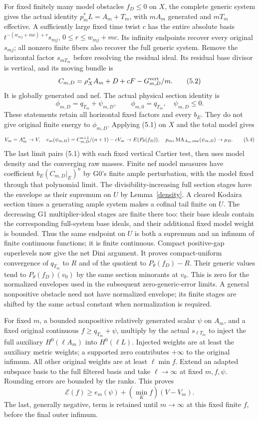 \documentclass[10pt]{article}
\newcommand{\MA}{\operatorname{MA}}
\begin{document}
For fixed finitely many model obstacles $f_D\leq0$ on $X$, the complete
generic system gives the actual identity $p_m^*L=A_m+T_m$, with
$mA_m$ generated and $mT_m$ effective. A sufficiently large fixed time
twist $c$ has the entire absolute basis
$t^{-(w_{mj}+mc)+r}s_{mj}$, $0\leq r\leq w_{mj}+mc$.
Its infinity endpoints recover every original $s_{mj}$; all nonzero
finite fibers also recover the full generic system. Remove the horizontal
factor $s_{mT_m}$ before resolving the residual ideal. Its residual base
divisor is vertical, and its moving bundle is
\[
 C_{m,D}=\rho_X^*A_m+D+cF-G_{m,D}^{\rm vert}/m.
 \tag{5.2}
\]
It is globally generated and nef. The actual physical section identity is
\[
 \phi_{m,D}=q_{T_m}+\psi_{m,D},\qquad\phi_{m,0}=q_{T_m},
 \quad\psi_{m,D}\leq0.
 \tag{5.3}
\]
These statements retain all horizontal fixed factors and every $b_E$.
They do not give original finite energy to $\phi_{m,D}$.
Applying (5.1) on $X$ and the total model gives
\[
 V_m=A_m^n\to V,\quad
 e_m(\psi_{m,D})=C_{m,D}^{n+1}/(n+1)-cV_m\to E(P_\theta(f_D)),
 \quad p_{m*}\MA_{A_m,\rm raw}(\psi_{m,D})\to\mu_D.
 \tag{5.4}
\]
The last limit pairs (5.1) with each fixed vertical Cartier test, then
uses model density and the converging raw masses. Finite nef model
measures have coefficient $b_E(C_{m,D}|_E)^n$ by G0's finite ample
perturbation, with the model fixed through that polynomial limit.
The divisibility-increasing full section stages have the envelope as
their supremum on $U$ by Lemma~\ref{density}. A cleared Kodaira section
times a generating ample system makes a cofinal tail finite on $U$.
The decreasing G1 multiplier-ideal stages are finite there too: their
base ideals contain the corresponding full-system base ideals, and their
additional fixed model weight is bounded. Thus the same endpoint on $U$
is both a supremum and an infimum of finite continuous functions; it is
finite continuous. Compact positive-gap superlevels now give the net
Dini argument. It proves compact-uniform convergence of $q_{T_m}$ to $R$
and of the quotient to $P_\theta(f_D)-R$.
Their generic values tend to $P_\theta(f_D)(v_0)$ by the same section
minorants at $v_0$. This is zero for the normalized envelopes used in
the subsequent zero-generic-error limits. A general nonpositive obstacle
need not have normalized envelope; its finite stages are shifted by the
same actual constant when normalization is required.

For fixed $m$, a bounded nonpositive relatively generated scalar $\psi$
on $A_m$, and a fixed original continuous $f\geq q_{T_m}+\psi$,
multiply by the actual $s_{\ell T_m}$ to inject the full auxiliary
$H^0(\ell A_m)$ into $H^0(\ell L)$. Injected weights are at least the
auxiliary metric weights; a supported zero contributes $+\infty$ to
the original infimum. All other original weights are at least
$\ell\min f$. Extend an adapted subspace basis to the full filtered
basis and take $\ell\to\infty$ at fixed $m,f,\psi$. Rounding errors
are bounded by the ranks. This proves
\[
 \mathscr E(f)\geq e_m(\psi)+(\min_K f)(V-V_m).
 \tag{5.5}
\]
The last, generally negative, term is retained until $m\to\infty$ at
this fixed finite $f$, before the final outer infimum.
\end{document}
